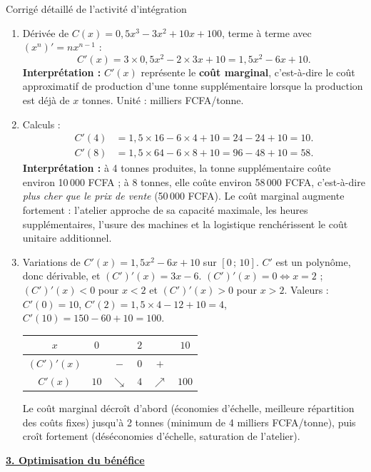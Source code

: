\documentclass[11pt]{article}
\begin{document}
\begin{exoresolu}{Corrigé détaillé de l'activité d'intégration}
\begin{enumerate}
    \item Dérivée de $C(x) = 0,5x^{3} - 3x^{2} + 10x + 100$, terme à terme avec $(x^n)'=nx^{n-1}$ :
    \[
    C'(x) = 3 \times 0,5 x^{2} - 2 \times 3 x + 10 = 1,5x^{2} - 6x + 10.
    \]
    \textbf{Interprétation :} $C'(x)$ représente le \textbf{coût marginal}, c'est-à-dire le coût approximatif de production d'une tonne supplémentaire lorsque la production est déjà de $x$ tonnes. Unité : milliers FCFA/tonne.
    \item Calculs :
    \begin{align*}
    C'(4) &= 1,5 \times 16 - 6 \times 4 + 10 = 24 - 24 + 10 = 10. \\
    C'(8) &= 1,5 \times 64 - 6 \times 8 + 10 = 96 - 48 + 10 = 58.
    \end{align*}
    \textbf{Interprétation :} à 4 tonnes produites, la tonne supplémentaire coûte environ 10\,000 FCFA ; à 8 tonnes, elle coûte environ 58\,000 FCFA, c'est-à-dire \emph{plus cher que le prix de vente} (50\,000 FCFA). Le coût marginal augmente fortement : l'atelier approche de sa capacité maximale, les heures supplémentaires, l'usure des machines et la logistique renchérissent le coût unitaire additionnel.
    \item Variations de $C'(x) = 1,5x^{2} - 6x + 10$ sur $[0\,;\, 10]$.
    $C'$ est un polynôme, donc dérivable, et $(C')'(x) = 3x - 6$.
    $(C')'(x) = 0 \iff x = 2$ ; $(C')'(x) < 0$ pour $x < 2$ et $(C')'(x) > 0$ pour $x > 2$.
    Valeurs : $C'(0) = 10$, $C'(2) = 1,5 \times 4 - 12 + 10 = 4$, $C'(10) = 150 - 60 + 10 = 100$.
    \begin{center}
    \begin{tabular}{|c|ccccc|}\hline
    $x$ & $0$ & & $2$ & & $10$ \\ \hline
    $(C')'(x)$ & & $-$ & $0$ & $+$ & \\ \hline
    $C'(x)$ & $10$ & $\searrow$ & $4$ & $\nearrow$ & $100$ \\ \hline
    \end{tabular}
    \end{center}
    Le coût marginal décroît d'abord (économies d'échelle, meilleure répartition des coûts fixes) jusqu'à 2 tonnes (minimum de 4 milliers FCFA/tonne), puis croît fortement (déséconomies d'échelle, saturation de l'atelier).
\end{enumerate}

\underline{\textbf{3. Optimisation du bénéfice}}


\end{exoresolu}
\end{document}
